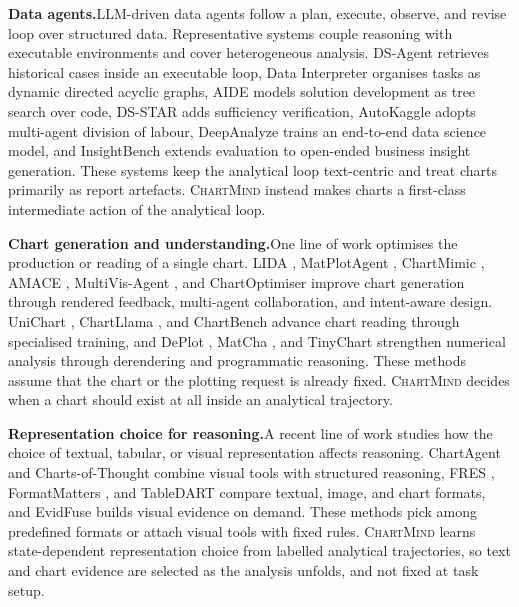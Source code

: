 \documentclass{article}
\newcommand{\method}{\textsc{ChartMind}\xspace}
\newcommand{\stitle}[1]{\noindent\textbf{#1}}
\begin{document}
\stitle{Data agents.}\quad LLM-driven data agents follow a plan, execute, observe, and revise loop over structured data. Representative systems couple reasoning with executable environments and cover heterogeneous analysis. DS-Agent \citep{guo2024dsagent} retrieves historical cases inside an executable loop, Data Interpreter \citep{hong2025datainterpreter} organises tasks as dynamic directed acyclic graphs, AIDE \citep{jiang2025aide} models solution development as tree search over code, DS-STAR \citep{nam2025dsstar} adds sufficiency verification, AutoKaggle \citep{li2025autokaggle} adopts multi-agent division of labour, DeepAnalyze \citep{zhang2025deepanalyze} trains an end-to-end data science model, and InsightBench \citep{sahu2025insightbench} extends evaluation to open-ended business insight generation. These systems keep the analytical loop text-centric and treat charts primarily as report artefacts. \method{} instead makes charts a first-class intermediate action of the analytical loop.

\stitle{Chart generation and understanding.}\quad One line of work optimises the production or reading of a single chart. LIDA \citep{dibia2023lida}, MatPlotAgent \citep{yang2024matplotagent}, ChartMimic \citep{yang2025chartmimic}, AMACE \citep{namgoong2025amace}, MultiVis-Agent \citep{lu2026multivisagent}, and ChartOptimiser \citep{wang2025chartoptimiser} improve chart generation through rendered feedback, multi-agent collaboration, and intent-aware design. UniChart \citep{masry2023unichart}, ChartLlama \citep{han2023chartllama}, and ChartBench \citep{xu2023chartbench} advance chart reading through specialised training, and DePlot \citep{liu2023deplot}, MatCha \citep{liu2023matcha}, and TinyChart \citep{zhang2024tinychart} strengthen numerical analysis through derendering and programmatic reasoning. These methods assume that the chart or the plotting request is already fixed. \method{} decides when a chart should exist at all inside an analytical trajectory.

\stitle{Representation choice for reasoning.}\quad A recent line of work studies how the choice of textual, tabular, or visual representation affects reasoning. ChartAgent \citep{kaur2026chartagent} and Charts-of-Thought \citep{das2025chartsofthought} combine visual tools with structured reasoning, FRES \citep{zhou2025fres}, FormatMatters \citep{ho2026formatmatters}, and TableDART \citep{xing2026tabledart} compare textual, image, and chart formats, and EvidFuse \citep{lin2026evidfuse} builds visual evidence on demand. These methods pick among predefined formats or attach visual tools with fixed rules. \method{} learns state-dependent representation choice from labelled analytical trajectories, so text and chart evidence are selected as the analysis unfolds, and not fixed at task setup.
\end{document}
